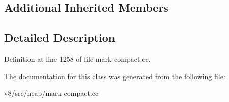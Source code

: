 \subsection*{Additional Inherited Members}


\subsection{Detailed Description}


Definition at line 1258 of file mark-\/compact.\+cc.



The documentation for this class was generated from the following file\+:\begin{DoxyCompactItemize}
\item 
v8/src/heap/mark-\/compact.\+cc\end{DoxyCompactItemize}
